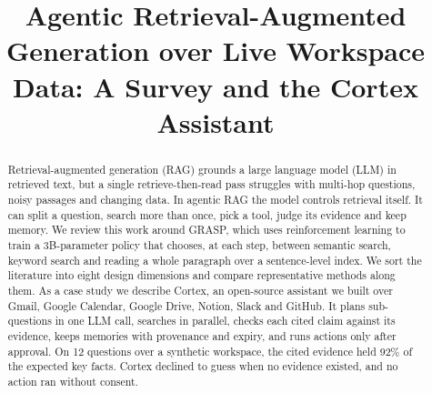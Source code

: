 \documentclass[conference]{IEEEtran}
\begin{document}
\title{Agentic Retrieval-Augmented Generation over Live Workspace Data: A Survey and the Cortex Assistant}

\author{
\and
{}
\and
{}
\and
{}
\and
{}
}

\maketitle

\begin{abstract}
Retrieval-augmented generation (RAG) grounds a large language model (LLM) in retrieved text, but a single retrieve-then-read pass struggles with multi-hop questions, noisy passages and changing data. In agentic RAG the model controls retrieval itself. It can split a question, search more than once, pick a tool, judge its evidence and keep memory. We review this work around GRASP, which uses reinforcement learning to train a 3B-parameter policy that chooses, at each step, between semantic search, keyword search and reading a whole paragraph over a sentence-level index. We sort the literature into eight design dimensions and compare representative methods along them. As a case study we describe Cortex, an open-source assistant we built over Gmail, Google Calendar, Google Drive, Notion, Slack and GitHub. It plans sub-questions in one LLM call, searches in parallel, checks each cited claim against its evidence, keeps memories with provenance and expiry, and runs actions only after approval. On 12 questions over a synthetic workspace, the cited evidence held 92\% of the expected key facts. Cortex declined to guess when no evidence existed, and no action ran without consent.
\end{abstract}
\end{document}

